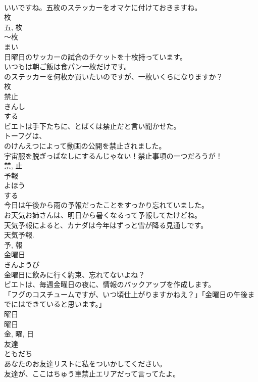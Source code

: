 \documentclass[8pt]{extreport}
\begin{document}
\begin{CJK}{UTF8}{min}
\\	いいですね。五枚のステッカーをオマケに付けておきますね。	
\\	枚 
\\	五, 枚	
\\	〜枚	
\\	まい	
\\	日曜日のサッカーの試合のチケットを十枚持っています。	
\\	いつもは朝ご飯は食パン一枚だけです。	
\\	のステッカーを何枚か買いたいのですが、一枚いくらになりますか？	
\\	枚	
\\	禁止	
\\	きんし	
\\	する 
\\	ビエトは手下たちに、とばくは禁止だと言い聞かせた。	
\\	トーフグは、
\\	のけんえつによって動画の公開を禁止されました。	
\\	宇宙服を脱ぎっぱなしにするんじゃない！禁止事項の一つだろうが！	
\\	禁, 止	
\\	予報	
\\	よほう	
\\	する 
\\	今日は午後から雨の予報だったことをすっかり忘れていました。	
\\	お天気お姉さんは、明日から暑くなるって予報してたけどね。	
\\	天気予報によると、カナダは今年はずっと雪が降る見通しです。	
\\	天気予報.	
\\	予, 報	
\\	金曜日	
\\	きんようび	
\\	金曜日に飲みに行く約束、忘れてないよね？	
\\	ビエトは、毎週金曜日の夜に、情報のバックアップを作成します。	
\\	「フグのコスチュームですが、いつ頃仕上がりますかねえ？」「金曜日の午後までにはできていると思います。」	
\\	曜日 
\\	曜日 
\\	金, 曜, 日	
\\	友達	
\\	ともだち	
\\	あなたのお友達リストに私をついかしてください。	
\\	友達が、ここはちゅう車禁止エリアだって言ってたよ。	

\end{CJK}
\end{document}
